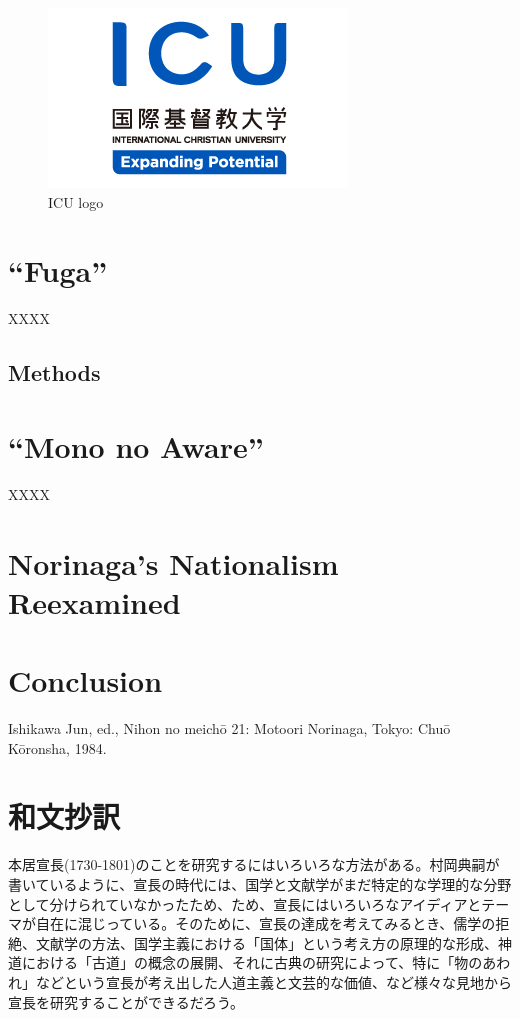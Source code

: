 \documentclass[12pt]{report}
\begin{document}
\begin{figure}[H]
    \begin{center}
    \includegraphics[width=\textwidth]{../figures/ICU_japan.jpg}
    \end{center}
    \caption{ICU logo}
    \label{1.1}
\end{figure}

\chapter{“Fuga”}
XXXX
\section{Methods}


\chapter{“Mono no Aware”}
XXXX

\chapter{Norinaga’s Nationalism Reexamined}

\chapter{Conclusion}
\begin{thebibliography}{99}


Ishikawa Jun, ed., Nihon no meichō 21: Motoori Norinaga, Tokyo: Chuō Kōronsha, 1984.
\end{thebibliography}
\chapter*{和文抄訳}
本居宣長(1730-1801)のことを研究するにはいろいろな方法がある。村岡典嗣が書いているように、宣長の時代には、国学と文献学がまだ特定的な学理的な分野として分けられていなかったため、ため、宣長にはいろいろなアイディアとテーマが自在に混じっている。そのために、宣長の達成を考えてみるとき、儒学の拒絶、文献学の方法、国学主義における「国体」という考え方の原理的な形成、神道における「古道」の概念の展開、それに古典の研究によって、特に「物のあわれ」などという宣長が考え出した人道主義と文芸的な価値、など様々な見地から宣長を研究することができるだろう。
\end{document}
